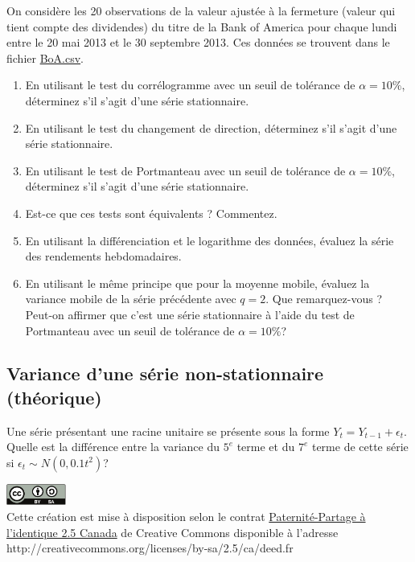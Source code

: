 \documentclass[11pt,english,francais]{article}
\begin{document}
On considère les 20 observations de la valeur ajustée à la fermeture (valeur qui tient compte des dividendes) du titre de la Bank of America pour chaque lundi entre le 20 mai 2013 et le 30 septembre 2013. Ces données se trouvent dans le fichier \url{BoA.csv}.

\begin{enumerate}
\item En utilisant le test du corrélogramme avec un seuil de tolérance de $\alpha = 10\%$, déterminez s'il s'agit d'une série stationnaire.

\item En utilisant le test du changement de direction, déterminez s'il s'agit d'une série stationnaire.

\item En utilisant le test de Portmanteau avec un seuil de tolérance de $\alpha = 10\%$, déterminez s'il s'agit d'une série stationnaire.

\item Est-ce que ces tests sont équivalents ? Commentez.

\item En utilisant la différenciation et le logarithme des données, évaluez la série des rendements hebdomadaires.

\item En utilisant le même principe que pour la moyenne mobile, évaluez la variance mobile de la série précédente avec $q=2$. Que remarquez-vous ? Peut-on affirmer que c'est une série stationnaire à l'aide du test de Portmanteau avec  un seuil de tolérance de $\alpha = 10\%$?
\end{enumerate}

\subsection{Variance d'une série non-stationnaire (théorique)}
\label{sec:variance-dune-serie}

Une série présentant une racine unitaire se présente sous la forme $Y_t = Y_{t-1}+\epsilon_t$. Quelle est la différence entre la variance du $5^e$ terme et du $7^e$ terme de cette série si $\epsilon_t \sim N(0, 0.1t^2)$?

\clearpage

\includegraphics[height=7mm,keepaspectratio=true]{by-sa}\\%
Cette création est mise à disposition selon le contrat
\href{http://creativecommons.org/licenses/by-sa/2.5/ca/deed.fr}{%
  Paternité-Partage à l'identique 2.5 Canada} de Creative Commons
disponible à l'adresse \\
http://creativecommons.org/licenses/by-sa/2.5/ca/deed.fr \\
\end{document}
